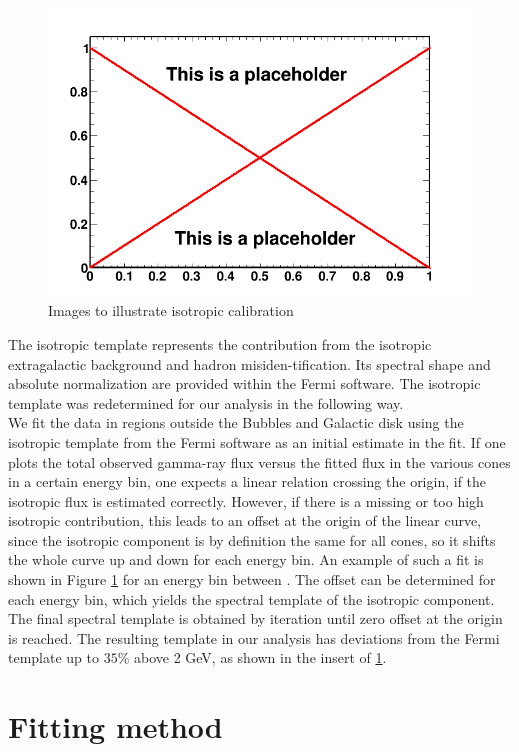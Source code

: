 \begin{figure}
 \centering
 \includegraphics[width=.9\linewidth]{pic/dummy.png}
 \caption{Images to illustrate isotropic calibration}
 \label{fig:iso_calibration}
\end{figure}

The isotropic template represents the contribution from the isotropic extragalactic background and hadron misiden-tification.  Its spectral shape and absolute normalization are provided within the Fermi software.  The isotropic template was redetermined for our analysis in the following way.\\
We fit the data in regions outside the Bubbles and Galactic disk using the isotropic template from the Fermi software as an initial estimate in the fit. If one plots the total observed gamma-ray flux versus the fitted flux in the various cones in a certain energy bin, one expects a linear relation crossing the origin, if the isotropic flux is estimated correctly. However, if there is a missing or too high isotropic contribution, this leads to an offset at the origin of the linear curve, since the isotropic component is by definition the same for all cones, so it shifts the whole curve up and down for each energy bin. An example of such a fit is shown in Figure \ref{fig:iso_calibration} for an energy bin between . The offset can be determined for each energy bin, which yields the spectral template of the isotropic component. The final spectral template is obtained by iteration until zero offset at the origin is reached. The resulting template in our analysis has deviations from the Fermi template up to $35\%$ above 2 GeV, as shown in the insert of \ref{fig:iso_calibration}.

\section{Fitting method}


